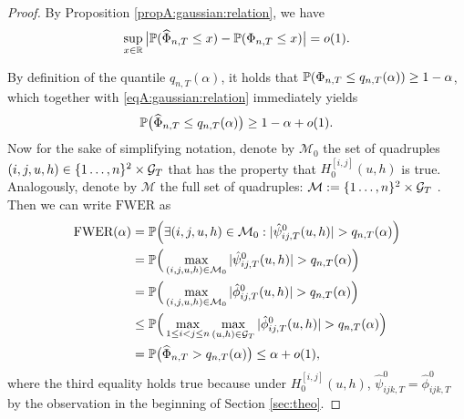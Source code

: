 \begin{proof}
By Proposition \ref{propA:gaussian:relation}, we have
\begin{equation}\label{eqA:gaussian:relation}
\sup_{x \in \mathbb{R}} \big| \mathbb{P}(\widehat{\Phi}_{n, T} \le x) - \mathbb{P}(\Phi_{n,T} \le x) \big| = o(1).
\end{equation}

By definition of the quantile $q_{n, T}(\alpha)$, it holds that $\mathbb{P}(\Phi_{n, T} \le q_{n, T}(\alpha)) \ge 1-\alpha$, which together with \eqref{eqA:gaussian:relation} immediately yields
\begin{equation}\label{eq:probbound-Psihat}
\mathbb{P} \big( \widehat{\Phi}_{n, T} \le q_{n, T}(\alpha) \big) \ge 1 - \alpha + o(1).
\end{equation}
Now for the sake of simplifying notation, denote by $\mathcal{M}_0$ the set of quadruples \linebreak $(i, j, u, h) \in \{1\ldots, n\}^2 \times \mathcal{G}_T$ that has the property that $H_0^{[i, j]}(u, h)$ is true. Analogously, denote by $\mathcal{M}$ the full set of quadruples: $\mathcal{M}: = \{1\ldots, n\}^2 \times \mathcal{G}_T$ . Then we can write $\text{FWER}$ as
\begin{align*}
\text{FWER}(\alpha)
 & = \mathbb{P} \Big( \exists (i,j,u, h) \in \mathcal{M}_0: |\hat{\psi}^0_{ij,T}(u, h)| > q_{n, T}(\alpha) \Big) \\
 & = \mathbb{P} \Big( \max_{(i, j, u, h) \in \mathcal{M}_0} |\hat{\psi}^0_{ij,T}(u, h)| > q_{n, T}(\alpha) \Big) \\
 & = \mathbb{P} \Big( \max_{(i,j,u, h) \in \mathcal{M}_0} |\hat{\phi}^0_{ij,T}(u, h)| > q_{n, T}(\alpha) \Big) \\
 & \le \mathbb{P} \Big( \max_{1 \le i < j \le n} \max_{(u, h) \in \mathcal{G}_T} |\hat{\phi}_{ij,T}^0(u, h)| > q_{n, T}(\alpha) \Big) \\
 & = \mathbb{P} \big( \widehat{\Phi}_{n, T} > q_{n, T}(\alpha) \big) \le \alpha + o(1),
\end{align*}
where the third equality holds true because under $H_0^{[i, j]}(u, h)$, $\hat{\psi}^0_{ijk,T} = \hat{\phi}^0_{ijk,T}$ by the observation in the beginning of Section \ref{sec:theo}.
\end{proof}

